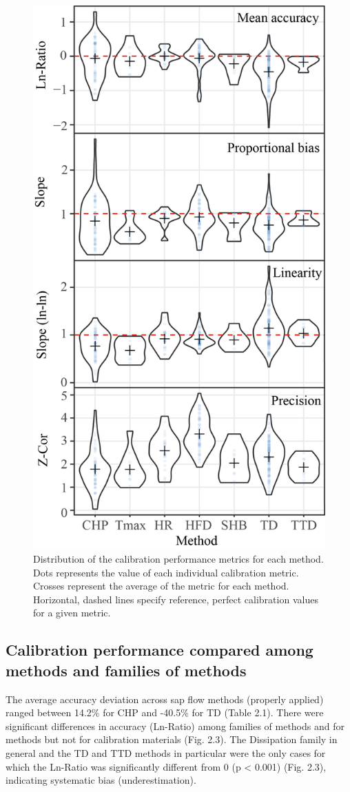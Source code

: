 \documentclass[11pt,twoside]{reedthesis}
\begin{document}
\begin{figure}[hbt!]

{\centering \includegraphics[width=0.55\linewidth]{figure/CH2/Distribution-metrics-orderedV4} 

}

\caption[Distribution of the calibration performance metrics for each method.]{Distribution of the calibration performance metrics for each method. Dots represents the value of each individual calibration metric. Crosses represent the average of the metric for each method. Horizontal, dashed lines specify reference, perfect calibration values for a given metric.}\label{fig:ch2fig2}
\end{figure}
\subsection{Calibration performance compared among methods and families
of
methods}\label{calibration-performance-compared-among-methods-and-families-of-methods}

The average accuracy deviation across sap flow methods (properly
applied) ranged between 14.2\% for CHP and -40.5\% for TD (Table 2.1).
There were significant differences in accuracy (Ln-Ratio) among families
of methods and for methods but not for calibration materials (Fig. 2.3).
The Dissipation family in general and the TD and TTD methods in
particular were the only cases for which the Ln-Ratio was significantly
different from 0 (p \textless{} 0.001) (Fig. 2.3), indicating systematic
bias (underestimation).\par
\end{document}
